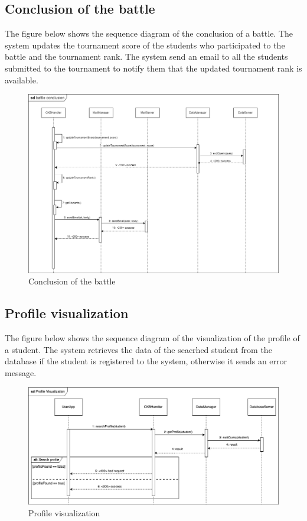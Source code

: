 \subsection{Conclusion of the battle}
The figure below shows the sequence diagram of the conclusion of a battle. The system updates the tournament
score of the students who participated to the battle and the tournament rank. The system send an email to all the students submitted
to the tournament to notify them that the updated tournament rank is available.
\begin{figure}[H]
    \centering
    \includegraphics[width=1\textwidth]{images/seq_diagrams/battle_conclusion_DD.png}
    \caption{Conclusion of the battle}
\end{figure}

\subsection{Profile visualization}
The figure below shows the sequence diagram of the visualization of the profile of a student. 
The system retrieves the data of the seacrhed student from the database if the student is registered to the system, otherwise it sends an error message.
\begin{figure}[H]
    \centering
    \includegraphics[width=1\textwidth]{images/seq_diagrams/ProfileVis_DD.png}
    \caption{Profile visualization}
\end{figure}

